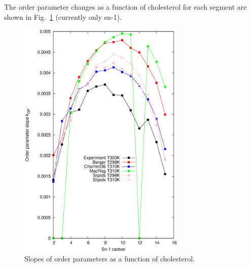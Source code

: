 \documentclass[aps,prl,superscriptaddress,twocolumn]{revtex4}
\begin{document}
The order parameter changes as a function of cholesterol for each segment are shown in Fig.~\ref{OrderParametersCHOLchanges}
(currently only sn-1). \\
\begin{figure}[]
  \centering
  \includegraphics[width=8cm]{../FIGS/slopes.eps}
  \caption{\label{OrderParametersCHOLchanges}
    Slopes of order parameters as a function of cholesterol.
  }
  
\end{figure}

\end{document}
